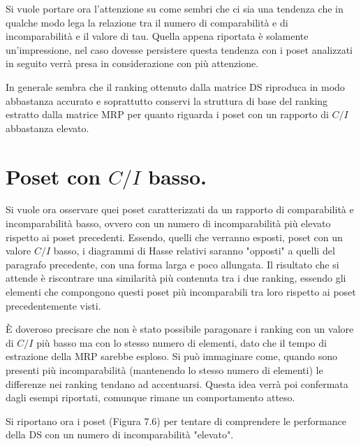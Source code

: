 \documentclass{report}
\begin{document}
Si vuole portare ora l'attenzione su come sembri che ci sia una tendenza che in qualche modo lega la relazione tra il numero di comparabilità e di incomparabilità e il valore di tau. Quella appena riportata è solamente un'impressione, nel caso dovesse persistere questa tendenza con i poset analizzati in seguito verrà presa in considerazione con più attenzione.


In generale sembra che il ranking ottenuto dalla matrice DS riproduca in modo abbastanza accurato e soprattutto conservi la struttura di base del ranking estratto dalla matrice MRP per quanto riguarda i poset con un rapporto di $C/I$ abbastanza elevato.


\section{Poset con $C/I$ basso.}
Si vuole ora osservare quei poset caratterizzati da un rapporto di comparabilità e incomparabilità basso, ovvero con un numero di incomparabilità più elevato rispetto ai poset precedenti. Essendo, quelli che verranno esposti, poset con un valore $C/I$ basso, i diagrammi di Hasse relativi saranno "opposti" a quelli del paragrafo precedente, con una forma larga e poco allungata. Il risultato che si attende è riscontrare una similarità più contenuta tra i due ranking, essendo gli elementi che compongono questi poset più incomparabili tra loro rispetto ai poset precedentemente visti. 


È doveroso precisare che non è stato possibile paragonare i ranking con un valore di $C/I$ più basso ma con lo stesso numero di elementi, dato che il tempo di estrazione della MRP sarebbe esploso. Si può immaginare come, quando sono presenti più incomparabilità (mantenendo lo stesso numero di elementi) le differenze nei ranking tendano ad accentuarsi. Questa idea verrà poi confermata dagli esempi riportati, comunque rimane un comportamento atteso.


Si riportano ora i poset (Figura 7.6) per tentare di comprendere le performance della DS con un numero di incomparabilità "elevato".
\end{document}

